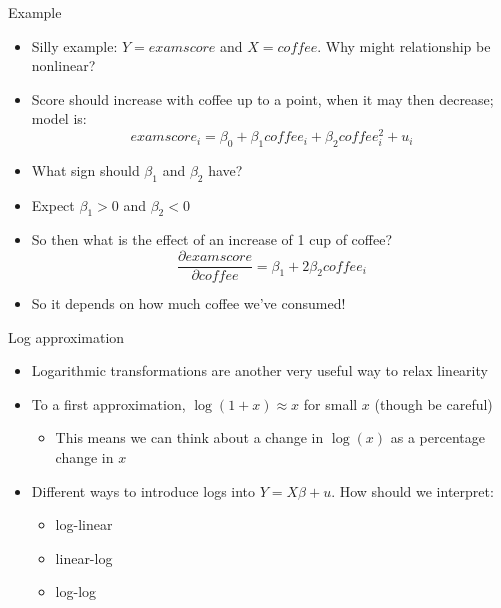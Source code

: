 \documentclass[aspectratio=169]{beamer}
\begin{document}
\begin{frame}{Example}
    \begin{itemize}
        \item Silly example: $Y = examscore$ and $X = coffee$. Why might relationship be nonlinear?
        \pause
        \item Score should increase with coffee up to a point, when it may then decrease; model is:
        $$
        examscore_i = \beta_0 + \beta_1 coffee_i + \beta_2 coffee_i^2 + u_i 
        $$
        \item What sign should $\beta_1$ and $\beta_2$ have?
        \pause
        \item Expect $\beta_1 > 0$ and $\beta_2 < 0$
        \item So then what is the effect of an increase of 1 cup of coffee?
        \pause
        $$ \dfrac{\partial examscore}{\partial coffee} = \beta_1 + 2\beta_2 coffee_i $$
        \item So it depends on how much coffee we've consumed!
    \end{itemize}
\end{frame}


\begin{frame}{Log approximation}
    \begin{itemize}
        \item Logarithmic transformations are another very useful way to relax linearity
        \item To a first approximation, $\log(1+x) \approx x$ for small $x$ (though be careful)
        \begin{itemize}
            \item This means we can think about a change in $\log(x)$ as a percentage change in $x$
        \end{itemize}
        \item Different ways to introduce logs into $Y=X\beta + u$. How should we interpret:
        \begin{itemize}
            \item log-linear
            \item linear-log
            \item log-log
        \end{itemize}
    \end{itemize}
\end{frame}
\end{document}
